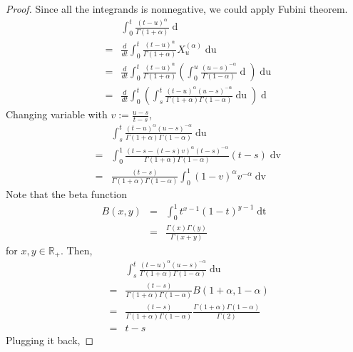 \documentclass[a4paper, twoside, 11pt]{article}
\theoremstyle{definition}
\newcommand{\brkt}[1]{\left({#1} \right)}
\begin{document}
  \begin{proof}
	Since all the integrands is nonnegative, we could apply Fubini theorem.
  \begin{eqnarray*}
	&&\int_0^t \frac{(t-u)^\alpha}{\Gamma(1+\alpha)}\mathop{dX^{(\alpha)}_u}\\
	&=& \frac{d}{dt}\int_0^t \frac{(t-u)^\alpha}{\Gamma(1+\alpha)} X^{(\alpha)}_u\mathop{du}\\
	&=& \frac{d}{dt}\int_0^t \frac{(t-u)^\alpha}{\Gamma(1+\alpha)} \brkt{ \int_0^u \frac{(u-s)^{-\alpha}}{\Gamma(1-\alpha)}\mathop{dX_s}}\mathop{du}\\
	&=& \frac{d}{dt}\int_{0}^{t} \brkt{\int_s^t \frac{(t-u)^\alpha (u-s)^{-\alpha}}{\Gamma(1+\alpha)\Gamma(1-\alpha)}\mathop{du}} \mathop{dX_s}
  \end{eqnarray*}
  Changing variable with $v:= \frac{u-s}{t-s}$,
  \begin{eqnarray*}
   &&\int_s^t \frac{(t-u)^\alpha (u-s)^{-\alpha}}{\Gamma(1+\alpha)\Gamma(1-\alpha)}\mathop{du}\\
   &=& \int_0^1 \frac{(t-s - (t-s)v)^\alpha (t-s)^{-\alpha}}{\Gamma(1+\alpha)\Gamma(1-\alpha)}(t-s)\mathop{dv}\\
   &=& \frac{(t-s)}{\Gamma(1+\alpha)\Gamma(1-\alpha)}\int_0^1 (1-v)^\alpha v^{-\alpha} \mathop{dv}
  \end{eqnarray*}
Note that the beta function 
\begin{eqnarray*}
  B(x,y) &=& \int_0^1 t^{x-1} (1-t)^{y-1} \mathop{dt}\\
  &=& \frac{\Gamma(x)\Gamma(y)}{\Gamma(x+y)}
\end{eqnarray*}
for $x, y \in \mathbb{R}_+$.
Then,
\begin{eqnarray*}
   &&\int_s^t \frac{(t-u)^\alpha (u-s)^{-\alpha}}{\Gamma(1+\alpha)\Gamma(1-\alpha)}\mathop{du}\\
   &=& \frac{(t-s)}{\Gamma(1+\alpha)\Gamma(1-\alpha)} B(1+\alpha, 1-\alpha)\\
   &=& \frac{(t-s)}{\Gamma(1+\alpha)\Gamma(1-\alpha)} \frac{\Gamma(1+\alpha)\Gamma(1-\alpha)}{\Gamma(2)}\\
   &=& t-s
  \end{eqnarray*}
  Plugging it back,

\end{proof}
\end{document}
